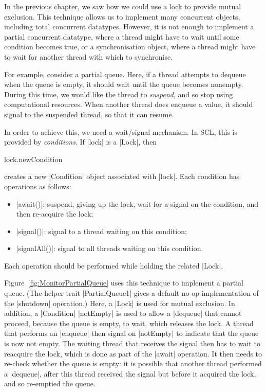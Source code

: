 In the previous chapter, we saw how we could use a lock to provide mutual
exclusion.  This technique allows us to implement many concurrent objects,
including total concurrent datatypes.  However, it is not enough to implement
a partial concurrent datatype, where a thread might have to wait until some
condition becomes true, or a synchronisation object, where a thread might have
to wait for another thread with which to synchronise. 

For example, consider a partial queue.  Here, if a thread attempts to dequeue
when the queue is empty, it should wait until the queue becomes nonempty.
During this time, we would like the thread to \emph{suspend}, and so stop
using computational resources.  When another thread does enqueue a value, it
should signal to the suspended thread, so that it can resume.  

In order to achieve this, we need a wait/signal mechanism.  In SCL, this is
provided by \emph{conditions}.  If |lock| is a |Lock|, then
\begin{scala}
  lock.newCondition
\end{scala}
creates a new |Condition| object associated with |lock|.  
Each condition has operations as follows:
%
\begin{itemize}
\item |await()|: suspend, giving up the lock, wait for a signal on the
  condition, and then re-acquire the lock;

\item |signal()|: signal to a thread waiting on this condition;

\item |signalAll()|: signal to all threads waiting on this condition.
\end{itemize}
%
Each operation should be performed while holding the related |Lock|. 

Figure~\ref{fig:MonitorPartialQueue} uses this technique to implement a
partial queue.  (The helper trait |PartialQueue1| gives a default no-op
implementation of the |shutdown| operation.)  Here, a |Lock| is used for
mutual exclusion.  In addition, a |Condition| |notEmpty| is used to allow a
|dequeue| that cannot proceed, because the queue is empty, to wait, which
releases the lock.  A thread that performs an |enqueue| then signal on
|notEmpty| to indicate that the queue is now not empty.  The waiting thread
that receives the signal then has to wait to reacquire the lock, which is done
as part of the |await| operation.  It then needs to re-check whether the queue
is empty: it is possible that another thread performed a |dequeue|, after this
thread received the signal but before it acquired the lock, and so re-emptied
the queue.

